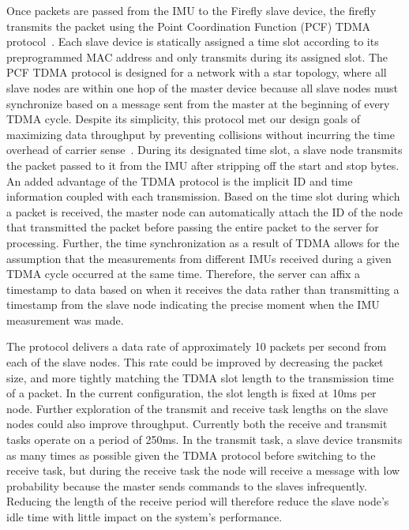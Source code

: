 \documentclass[conference]{IEEEtran}
\begin{document}
Once packets are passed from the IMU to the Firefly slave device, the firefly transmits
the packet using the Point Coordination Function (PCF) TDMA protocol~\cite{pcf}. Each
slave device is statically assigned a time slot according to its preprogrammed MAC address
and only transmits during its assigned slot. The PCF TDMA protocol is designed for a
network with a star topology, where all slave nodes are within one hop of the master
device because all slave nodes must synchronize based on a message sent from the master at
the beginning of every TDMA cycle.  Despite its simplicity, this protocol met our design
goals of maximizing data throughput by preventing collisions without incurring the time
overhead of carrier sense~\cite{CSMA}.  During its designated time slot, a slave node
transmits the packet passed to it from the IMU after stripping off the start and stop
bytes. An added advantage of the TDMA protocol is the implicit ID and time information
coupled with each transmission. Based on the time slot during which a packet is received,
the master node can automatically attach the ID of the node that transmitted the packet
before passing the entire packet to the server for processing. Further, the time
synchronization as a result of TDMA allows for the assumption that the measurements from
different IMUs received during a given TDMA cycle occurred at the same time. Therefore,
the server can affix a timestamp to data based on when it receives the data rather than
transmitting a timestamp from the slave node indicating the precise moment when the IMU
measurement was made. 

The protocol delivers a data rate of approximately 10 packets per second from each of
the slave nodes. This rate could be improved by decreasing the packet size, and more
tightly matching the TDMA slot length to the transmission time of a packet. In the current
configuration, the slot length is fixed at 10ms per node. Further exploration of the
transmit and receive task lengths on the slave nodes could also improve throughput.
Currently both the receive and transmit tasks operate on a period of 250ms. In the
transmit task, a slave device transmits as many times as possible given the TDMA protocol
before switching to the receive task, but during the receive task the node will receive a
message with low probability because the master sends commands to the slaves infrequently.
Reducing the length of the receive period will therefore reduce the slave node's idle
time with little impact on the system's performance. 
\end{document}
